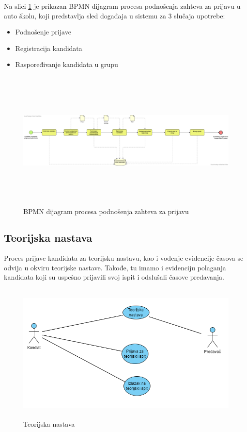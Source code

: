 Na slici \ref{fig:bpmn_podnosenje_zahteva} je prikazan BPMN dijagram procesa podnošenja zahteva za prijavu u auto školu,
koji predstavlja sled događaja u sistemu za 3 slučaja upotrebe:
\begin{itemize}
    \item Podnošenje prijave
    \item Registracija kandidata
    \item Raspoređivanje kandidata u grupu
\end{itemize}

\begin{figure}[H]
    \begin{center}
        \includegraphics[width=155mm, height = 70mm]{Diagrams/bpmn_podnosenje_zahteva.png}
    \end{center}
    \caption {BPMN dijagram procesa podnošenja zahteva za prijavu}
    \label{fig:bpmn_podnosenje_zahteva}

\end{figure}


\subsection {Teorijska nastava}
Proces prijave kandidata za teorijsku nastavu, kao i vođenje evidencije časova se odvija u okviru teorijske nastave. 
Takođe, tu imamo i evidenciju polaganja kandidata koji su uspešno prijavili svoj ispit i odslušali časove predavanja.

\begin{figure}[H]
  \begin{center}
      \includegraphics[width=150mm, height=70mm]{Diagrams/diagram teorijska nastava.png}
  \end{center}
  \caption {Teorijska nastava}
  \label{theory}

\end{figure}

